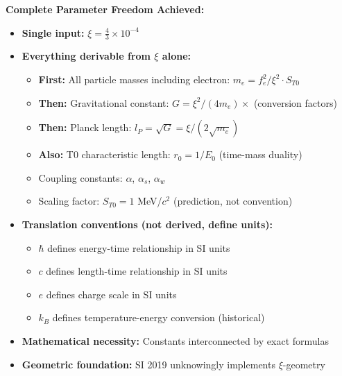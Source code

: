 \documentclass[12pt,a4paper]{article}
\begin{document}
	\begin{keyresult}
		\textbf{Complete Parameter Freedom Achieved:}
		\begin{itemize}
			\item \textbf{Single input:} $\xi = \frac{4}{3} \times 10^{-4}$
			
			\item \textbf{Everything derivable from $\xi$ alone:}
			\begin{itemize}
				\item \textbf{First:} All particle masses including electron: $m_e = f_e^2/\xi^2 \cdot S_{T0}$
				\item \textbf{Then:} Gravitational constant: $G = \xi^2/(4m_e) \times$ (conversion factors)
				\item \textbf{Then:} Planck length: $l_P = \sqrt{G} = \xi/(2\sqrt{m_e})$
				\item \textbf{Also:} T0 characteristic length: $r_0 = 1/E_0$ (time-mass duality)
				\item Coupling constants: $\alpha$, $\alpha_s$, $\alpha_w$
				\item Scaling factor: $S_{T0} = 1$ MeV/$c^2$ (prediction, not convention)
			\end{itemize}
			
			\item \textbf{Translation conventions (not derived, define units):}
			\begin{itemize}
				\item $\hbar$ defines energy-time relationship in SI units
				\item $c$ defines length-time relationship in SI units
				\item $e$ defines charge scale in SI units
				\item $k_B$ defines temperature-energy conversion (historical)
			\end{itemize}
			
			\item \textbf{Mathematical necessity:} Constants interconnected by exact formulas
			
			\item \textbf{Geometric foundation:} SI 2019 unknowingly implements $\xi$-geometry
		\end{itemize}
	\end{keyresult}
	
	\begin{center}
	\end{center}
	
\end{document}
